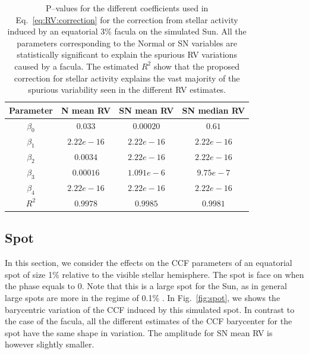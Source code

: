 \documentclass{aa}
\begin{document}
\begin{table}
\begin{center}
\caption{P--values for the different coefficients used in Eq.~\ref{eq:RV:correction} for the correction from stellar activity induced by an equatorial 3\% facula on the simulated Sun. All the parameters corresponding to the Normal or SN variables are statistically significant to explain the spurious RV variations caused by a facula. The estimated $R^{2}$ show that the proposed correction for stellar activity explains the vast majority of the spurious variability seen in the different RV estimates.}
\label{table:faculae.test}
\begin{tabular}{|c|c|c|c|}
\hline
Parameter          & N mean RV         &   SN mean RV &   SN median RV \\
\hline
$\beta_{0}$            &    $0.033$    & $0.00020$ & $0.61$ \\
\hline
$\beta_{1}$            &    $2.22e-16 $    & $2.22e-16 $ & $2.22e-16 $ \\
\hline
$\beta_{2}$            &     $0.0034$   &  $2.22e-16 $ & $2.22e-16 $\\
\hline
$\beta_{3}$            &     $0.00016$   &  $1.091e-6$ & $9.75e-7$\\
\hline
$\beta_{4}$            &     $2.22e-16$   &  $2.22e-16$ & $2.22e-16$\\
\hline
$R^{2}$      &     $0.9978$    &  $0.9985$ & $0.9981$  \\
\hline
\end{tabular}
\end{center}
\end{table}

\subsection{Spot} \label{sec:soap.spot}

In this section, we consider the effects on the CCF parameters of an equatorial spot of size 1\% relative to the visible stellar hemisphere. The spot is face on when the phase equals to 0. Note that this is a large spot for the Sun, as in general large spots are more in the regime of 0.1\% \citep[e.g.][]{Borgniet-2015}. In Fig.~\ref{fig:spot}, we shows the barycentric variation of the CCF induced by this simulated spot. In contrast to the case of the facula, all the different estimates of the CCF barycenter for the spot have the same shape in variation. The amplitude for SN mean RV is however slightly smaller.
\end{document}
